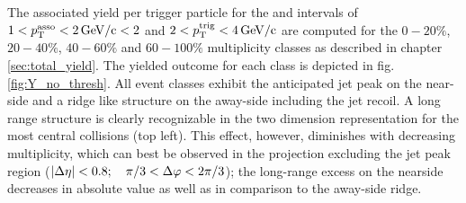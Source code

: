 The associated yield per trigger particle for the \ptassoc and \pttrig intervals of $ 1 < p_{\text{T}}^{\text{asso}} < \SI{2}{GeV/c} < 2$ and $ 2 < p_{\text{T}}^{\text{trig}} < \SI{4}{GeV/c}$ are computed for the $0-20\%$, $20-40\%$, $40-60\%$ and $60-100\%$ multiplicity classes as described in chapter \ref{sec:total_yield}. The yielded outcome for each class is depicted in fig. \ref{fig:Y_no_thresh}. All event classes exhibit the anticipated jet peak on the \gls{near-side} and a ridge like structure on the \gls{away-side} including the jet recoil. A long range \deta structure is clearly recognizable in the two dimension representation for the most central collisions (top left). This effect, however, diminishes with decreasing multiplicity, which can best be observed in the \dphi projection excluding the jet peak region ($|\Delta\eta| < 0.8;  \quad \pi /3 < \Delta\varphi < 2 \pi /3$); the long-range excess on the nearside decreases in absolute value as well as in comparison to the \gls{away-side} ridge.
